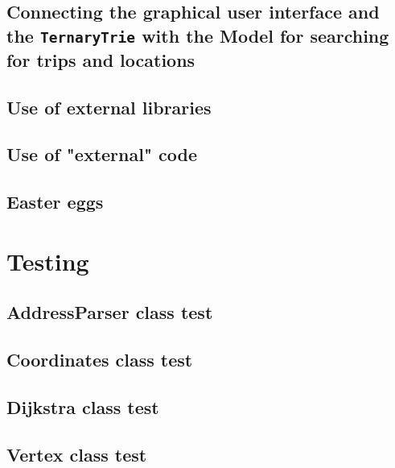 \documentclass[a4paper,11pt]{article}
\begin{document}
\subsection{Connecting the graphical user interface and the \texttt{TernaryTrie} with the Model for searching for trips and locations}


\subsection{Use of external libraries}


\subsection{Use of "external" code}


\subsection{Easter eggs}
\label{sec:Imp, Easter eggs}


\pagebreak
\section{Testing}
\label{sec:Testing}


\subsection{AddressParser class test}


\subsection{Coordinates class test}


\subsection{Dijkstra class test}


\subsection{Vertex class test}

\end{document}
